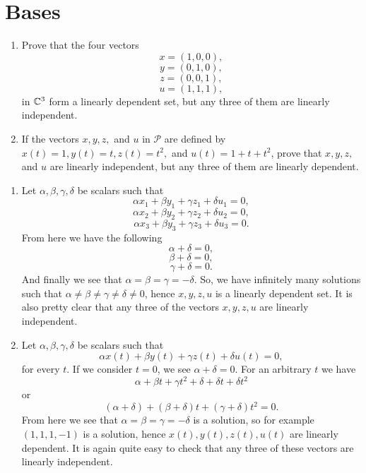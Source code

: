 \section{Bases}


\begin{problem}
  \begin{enumerate}[label=(\alph*)]
    \item Prove that the four vectors
      \[x = (1, 0, 0),\]
      \[y = (0, 1, 0),\]
      \[z = (0, 0, 1),\]
      \[u = (1, 1, 1),\]
      in $\mathbb{C}^3$ form a linearly dependent set, but any three of them are linearly independent.
    \item If the vectors $x, y, z,$ and $u$ in $\mathcal{P}$ are defined by $x(t) = 1, y(t) = t, z(t) = t^2,$ and $u(t) = 1 + t + t^2$, prove that $x, y, z,$ and $u$ are linearly independent, but any three of them are linearly dependent.
  \end{enumerate}
\end{problem}

\begin{solution}
  \begin{enumerate}[label=(\alph*)]
    \item Let $\alpha, \beta, \gamma, \delta$ be scalars such that
      \[\alpha x_1 + \beta y_1 + \gamma z_1 + \delta u_1 = 0,\]
      \[\alpha x_2 + \beta y_2 + \gamma z_2 + \delta u_2 = 0,\]
      \[\alpha x_3 + \beta y_3 + \gamma z_3 + \delta u_3 = 0.\]
      From here we have the following
      \[\alpha + \delta = 0,\]
      \[\beta + \delta = 0,\]
      \[\gamma + \delta = 0.\]
      And finally we see that $\alpha = \beta = \gamma = -\delta$.
      So, we have infinitely many solutions such that $\alpha \neq \beta \neq \gamma \neq \delta \neq 0$, hence $x, y, z, u$ is a linearly dependent set.
      It is also pretty clear that any three of the vectors $x, y, z, u$ are linearly independent.
    \item Let $\alpha, \beta, \gamma, \delta$ be scalars such that
      \[\alpha x(t) + \beta y(t) + \gamma z(t) + \delta u(t) = 0,\]
      for every $t$.
      If we consider $t = 0$, we see $\alpha + \delta = 0$.
      For an arbitrary $t$ we have
      \[\alpha + \beta t + \gamma t^2 + \delta + \delta t + \delta t^2\]
      or
      \[(\alpha + \delta) + (\beta + \delta)t + (\gamma + \delta)t^2 = 0.\]
      From here we see that $\alpha = \beta = \gamma = -\delta$ is a solution, so for example $(1, 1, 1, -1)$ is a solution, hence $x(t), y(t), z(t), u(t)$ are linearly dependent.
      It is again quite easy to check that any three of these vectors are linearly independent.
  \end{enumerate}
\end{solution}

